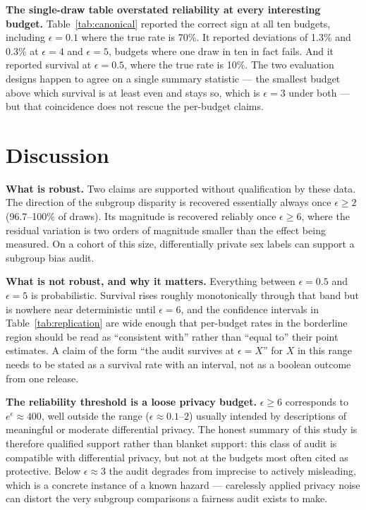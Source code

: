 \documentclass[11pt]{article}
\begin{document}
\textbf{The single-draw table overstated reliability at every interesting budget.} Table~\ref{tab:canonical} reported the correct sign at all ten budgets, including $\epsilon=0.1$ where the true rate is 70\%. It reported deviations of 1.3\% and 0.3\% at $\epsilon=4$ and $\epsilon=5$, budgets where one draw in ten in fact fails. And it reported survival at $\epsilon=0.5$, where the true rate is 10\%. The two evaluation designs happen to agree on a single summary statistic --- the smallest budget above which survival is at least even and stays so, which is $\epsilon=3$ under both --- but that coincidence does not rescue the per-budget claims.

\section{Discussion}

\textbf{What is robust.} Two claims are supported without qualification by these data. The direction of the subgroup disparity is recovered essentially always once $\epsilon \geq 2$ (96.7--100\% of draws). Its magnitude is recovered reliably once $\epsilon \geq 6$, where the residual variation is two orders of magnitude smaller than the effect being measured. On a cohort of this size, differentially private sex labels can support a subgroup bias audit.

\textbf{What is not robust, and why it matters.} Everything between $\epsilon=0.5$ and $\epsilon=5$ is probabilistic. Survival rises roughly monotonically through that band but is nowhere near deterministic until $\epsilon=6$, and the confidence intervals in Table~\ref{tab:replication} are wide enough that per-budget rates in the borderline region should be read as ``consistent with'' rather than ``equal to'' their point estimates. A claim of the form ``the audit survives at $\epsilon=X$'' for $X$ in this range needs to be stated as a survival rate with an interval, not as a boolean outcome from one release.

\textbf{The reliability threshold is a loose privacy budget.} $\epsilon \geq 6$ corresponds to $e^{\epsilon} \approx 400$, well outside the range ($\epsilon \approx 0.1$--$2$) usually intended by descriptions of meaningful or moderate differential privacy. The honest summary of this study is therefore qualified support rather than blanket support: this class of audit is compatible with differential privacy, but not at the budgets most often cited as protective. Below $\epsilon \approx 3$ the audit degrades from imprecise to actively misleading, which is a concrete instance of a known hazard --- carelessly applied privacy noise can distort the very subgroup comparisons a fairness audit exists to make.
\end{document}

